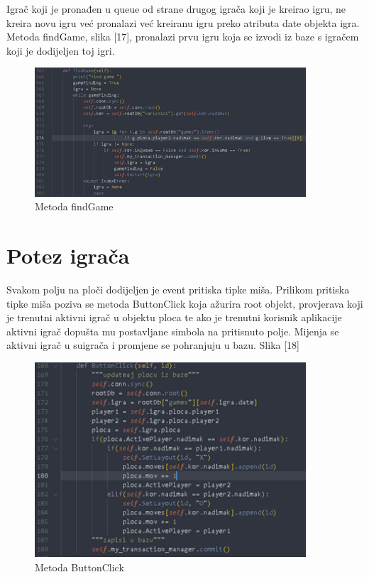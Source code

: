 \documentclass[]{foi} %
\begin{document}
Igrač koji je pronađen u queue od strane drugog igrača koji je kreirao igru, ne kreira novu igru već pronalazi već kreiranu igru preko atributa date objekta igra. Metoda findGame, slika [17], pronalazi prvu igru koja se izvodi iz baze s igračem koji je dodijeljen toj igri.



\begin{figure}[]
    \centering
    \includegraphics[width=0.9\textwidth]{slike/impl_7.png}
    \caption{Metoda findGame \cite{Vlastita izrada}}
    \label{fig:podjela}
\end{figure}

\section{Potez igrača}


Svakom polju na ploči dodijeljen je event pritiska tipke miša. Prilikom pritiska tipke miša poziva se metoda ButtonClick koja ažurira root objekt, provjerava koji je trenutni aktivni igrač u objektu ploca te ako je trenutni korisnik aplikacije aktivni igrač dopušta mu postavljane simbola na pritisnuto polje. Mijenja se aktivni igrač u suigrača i promjene se pohranjuju u bazu. Slika [18]

\begin{figure}[]
    \centering
    \includegraphics[width=0.9\textwidth]{slike/impl_8.png}
    \caption{Metoda ButtonClick \cite{Vlastita izrada}}
    \label{fig:podjela}
\end{figure}
\end{document}
